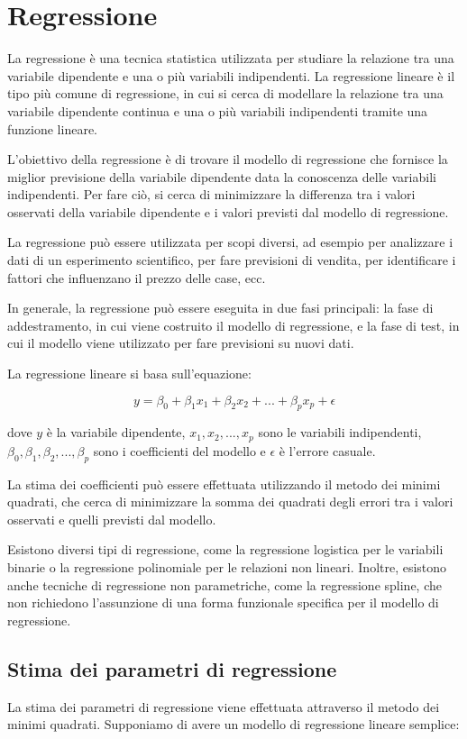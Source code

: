 \chapter{Regressione}
La regressione è una tecnica statistica utilizzata per studiare la relazione tra una variabile dipendente e una o più variabili indipendenti. La regressione lineare è il tipo più comune di regressione, in cui si cerca di modellare la relazione tra una variabile dipendente continua e una o più variabili indipendenti tramite una funzione lineare.

L'obiettivo della regressione è di trovare il modello di regressione che fornisce la miglior previsione della variabile dipendente data la conoscenza delle variabili indipendenti. Per fare ciò, si cerca di minimizzare la differenza tra i valori osservati della variabile dipendente e i valori previsti dal modello di regressione.

La regressione può essere utilizzata per scopi diversi, ad esempio per analizzare i dati di un esperimento scientifico, per fare previsioni di vendita, per identificare i fattori che influenzano il prezzo delle case, ecc.

In generale, la regressione può essere eseguita in due fasi principali: la fase di addestramento, in cui viene costruito il modello di regressione, e la fase di test, in cui il modello viene utilizzato per fare previsioni su nuovi dati.

La regressione lineare si basa sull'equazione:

$$y = \beta_0 + \beta_1 x_1 + \beta_2 x_2 + ... + \beta_p x_p + \epsilon$$

dove $y$ è la variabile dipendente, $x_1, x_2, ..., x_p$ sono le variabili indipendenti, $\beta_0, \beta_1, \beta_2, ..., \beta_p$ sono i coefficienti del modello e $\epsilon$ è l'errore casuale.

La stima dei coefficienti può essere effettuata utilizzando il metodo dei minimi quadrati, che cerca di minimizzare la somma dei quadrati degli errori tra i valori osservati e quelli previsti dal modello.

Esistono diversi tipi di regressione, come la regressione logistica per le variabili binarie o la regressione polinomiale per le relazioni non lineari. Inoltre, esistono anche tecniche di regressione non parametriche, come la regressione spline, che non richiedono l'assunzione di una forma funzionale specifica per il modello di regressione.

\section{Stima dei parametri di regressione}
La stima dei parametri di regressione viene effettuata attraverso il metodo dei minimi quadrati. Supponiamo di avere un modello di regressione lineare semplice:

